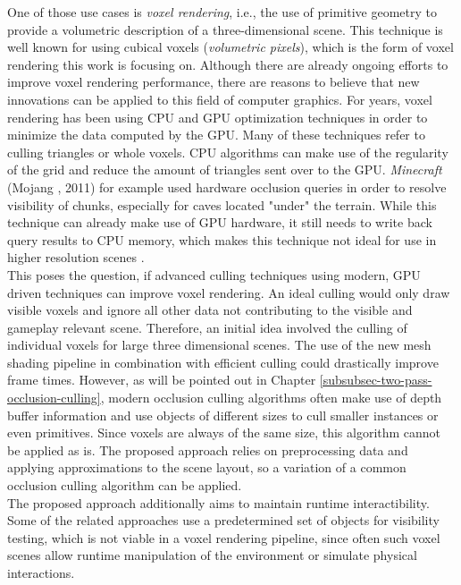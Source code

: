 \noindent
One of those use cases is \emph{voxel rendering}, i.e., the use of primitive geometry to provide a 
volumetric description of a three-dimensional scene. This technique is well known for using 
cubical voxels (\emph{volumetric pixels}), which is the form of voxel rendering this work is 
focusing on. Although there are already ongoing efforts to improve voxel rendering performance, there are 
reasons to believe that new innovations can be applied to this field of computer graphics. For years, 
voxel rendering has been using \ac{CPU} and \ac{GPU} optimization techniques in order to minimize 
the data computed by the \ac{GPU}. Many of these techniques refer to culling triangles or whole voxels. 
\ac{CPU} algorithms can make use of the regularity of the grid and reduce the amount of triangles sent 
over to the \ac{GPU}. \emph{Minecraft} (Mojang \cite{Mojang2024}, 2011) for example used hardware 
occlusion queries in order to resolve visibility of chunks, especially for caves located "under" the 
terrain. While this technique can already make use of \ac{GPU} hardware, it still needs to write back 
query results to \ac{CPU} memory, which makes this technique not ideal for use in higher resolution 
scenes \cite{TommosBlog2014}. \\

\noindent
This poses the question, if advanced culling techniques using modern, \ac{GPU} driven techniques can 
improve voxel rendering. An ideal culling would only draw visible voxels and ignore all other data 
not contributing to the visible and gameplay relevant scene. Therefore, an initial idea involved 
the culling of individual voxels for large three dimensional scenes. The use of the new mesh shading 
pipeline in combination with efficient culling could drastically improve frame times. However, as will be 
pointed out in Chapter \ref{subsubsec-two-pass-occlusion-culling}, modern occlusion culling algorithms 
often make use of depth buffer information and use objects of different sizes to cull smaller instances 
or even primitives. Since voxels are always of the same size, this algorithm cannot be applied as is. 
The proposed approach relies on preprocessing data and applying approximations to the scene layout, 
so a variation of a common occlusion culling algorithm can be applied. \\

\noindent
The proposed approach additionally aims to maintain runtime interactibility. Some of the related approaches 
use a predetermined set of objects for visibility testing, which is not viable in a voxel rendering pipeline, 
since often such voxel scenes allow runtime manipulation of the environment or simulate physical interactions. 

